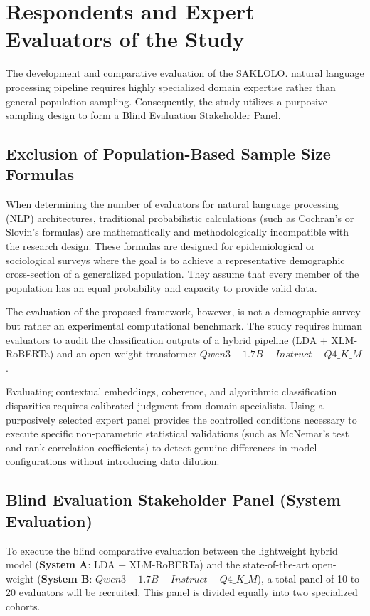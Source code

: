 \documentclass[12pt,a4paper]{report}
\newcommand{\sysA}{\textbf{System A}}
\newcommand{\sysB}{\textbf{System B}}
\newcommand{\xlmr}{XLM-RoBERTa}
\begin{document}
\section{Respondents and Expert Evaluators of the Study}

The development and comparative evaluation of the SAKLOLO. natural language
processing pipeline requires highly specialized domain expertise rather than
general population sampling. Consequently, the study utilizes a purposive
sampling design to form a Blind Evaluation Stakeholder Panel.

\subsection{Exclusion of Population-Based Sample Size Formulas}

When determining the number of evaluators for natural language processing (NLP)
architectures, traditional probabilistic calculations (such as Cochran's or
Slovin's formulas) are mathematically and methodologically incompatible with
the research design. These formulas are designed for epidemiological or
sociological surveys where the goal is to achieve a representative demographic
cross-section of a generalized population. They assume that every member of the
population has an equal probability and capacity to provide valid data.

The evaluation of the proposed framework, however, is not a demographic survey
but rather an experimental computational benchmark. The study requires human
evaluators to audit the classification outputs of a hybrid pipeline
(LDA + XLM-RoBERTa) and an open-weight transformer $Qwen3-1.7B-Instruct-Q4\_K\_M$.

Evaluating contextual embeddings, coherence, and algorithmic classification
disparities requires calibrated judgment from domain specialists. Using a
purposively selected expert panel provides the controlled conditions necessary
to execute specific non-parametric statistical validations (such as McNemar's
test and rank correlation coefficients) to detect genuine differences in model
configurations without introducing data dilution.

\subsection{Blind Evaluation Stakeholder Panel (System Evaluation)}

To execute the blind comparative evaluation between the lightweight hybrid model
(\sysA: LDA + \xlmr) and the state-of-the-art open-weight
(\sysB: $Qwen3-1.7B-Instruct-Q4\_K\_M$), a total panel of 10 to 20 evaluators will be recruited. This panel is
divided equally into two specialized cohorts.
\end{document}

